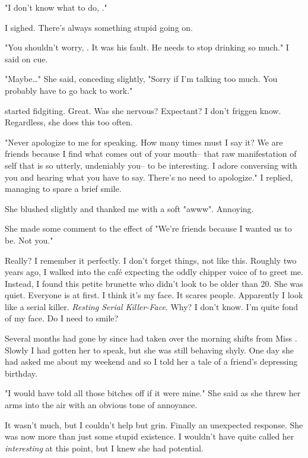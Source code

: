"I don't know what to do, \josh."
\VV


\noindent
I sighed.  There's always something stupid going on.
\VV


"You shouldn't worry, \april.  It was his fault.
He needs to stop drinking so much." I said on cue.


"Maybe\ldots{}" She said, conceding slightly,
"Sorry if I'm talking too much.  You probably have to go back to work."
\VV


\noindent
\april{} started fidgiting.  Great.  Was she nervous?  Expectant?
I don't friggen know.  Regardless, she does this too often.
\VV


"Never apologize to me for speaking.  How many times must I say it?
We are friends because I find what comes out of your mouth--
that raw manifestation of self that is so utterly, undeniably you--
to be interesting.
I adore conversing with you and hearing what you have to say.
There's no need to apologize."
I replied, managing to spare a brief smile.
\VV


\noindent
She blushed slightly and thanked me with a soft "awww".  Annoying.


\noindent
She made some comment to the effect of
"We're friends because I wanted us to be.  Not you."


\noindent
Really?  I remember it perfectly.  I don't forget things, not like this.
Roughly two years ago, I walked into the caf\'e expecting the oddly chipper
voice of \emma{} to greet me.  Instead, I found this petite brunette who didn't
look to be older than 20.  She was quiet.  Everyone is at first.
I think it's my face.  It scares people.
Apparently I look like a serial killer.
\textit{Resting Serial Killer-Face}.
Why? I don't know.  I'm quite fond of my face.  Do I need to smile?


Several months had gone by since \april{} had taken over the morning shifts from
Miss \emma.  Slowly I had gotten her to speak, but she was still behaving
shyly.  One day she had asked me about my weekend and so I told her a tale
of a friend's depressing birthday.
\VV


"I would have told all those bitches off if it were mine."
She said as she threw her arms into the air with an obvious tone of annoyance.
\VV


\noindent
It wasn't much, but I couldn't help but grin.  Finally an unexpected response.
She was now more than just some stupid existence.
I wouldn't have quite called her \textit{interesting} at this point,
but I knew she had potential.
\VV


